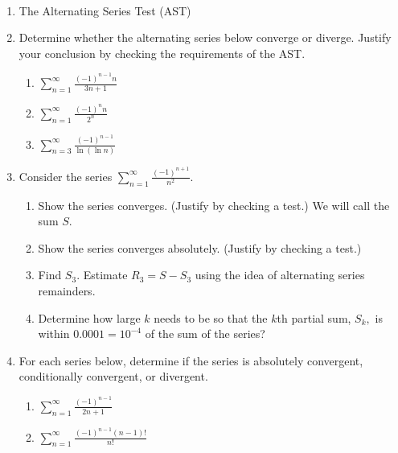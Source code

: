\documentclass[11pt]{amsart}
\newcommand{\ds}{\displaystyle}
\begin{document}
\begin{center}
  \large
  \\
\end{center}

\bigskip
\renewcommand{\labelenumi}{\textbf{\arabic{enumi}.}}
\begin{enumerate}
\item The Alternating Series Test (AST)
\vspace{2.2in}

\item  Determine whether the alternating series below converge or diverge.  Justify your conclusion by checking the requirements of the AST.\\

\begin{enumerate}
\item $\ds  \sum_{n=1}^\infty \frac{(-1)^{n-1}n}{3n+1} $
\vfill

\item $\ds  \sum_{n=1}^\infty \frac{(-1)^{n}n}{2^n} $
\vfill

\item $\ds  \sum_{n=3}^\infty \frac{(-1)^{n-1}}{\ln(\ln n)} $
\vfill
\end{enumerate}


\newpage
\item Consider the series $\ds \sum_{n=1}^\infty \frac{(-1)^{n+1}}{n^2}. $ 
	\begin{enumerate}
	\item Show the series converges.  (Justify by checking a test.)  We will call the sum $S$.
	\vfill
	\item Show the series converges absolutely.  (Justify by checking a test.)
	\vspace{0.6in}
	\item Find $S_3$.  Estimate $R_3=S-S_3$ using the idea of alternating series remainders.
	\vfill
	\item  Determine how large $k$ needs to be so that the $k$th partial sum, $S_k,$ is within $0.0001=10^{-4}$ of the sum of the series?
	\vfill
	\end{enumerate}

\item For each series below, determine if the series is absolutely convergent, conditionally convergent, or divergent.
	\begin{enumerate}
	\item $\ds  \sum_{n=1}^\infty \frac{(-1)^{n-1}}{2n+1} $
	\vfill
	\item $\ds  \sum_{n=1}^\infty \frac{(-1)^{n-1} (n-1)!}{n!} $
	\vfill
	\end{enumerate}
\end{enumerate}
\end{document}
